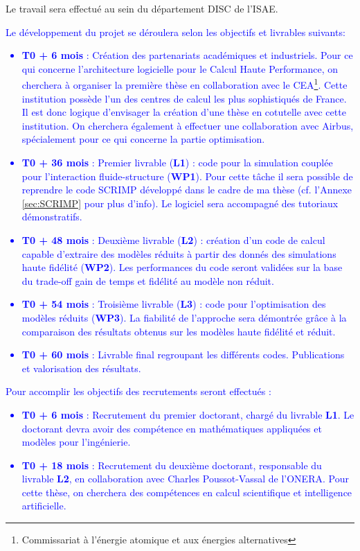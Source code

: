 \documentclass[12pt, french]{article}
\newcommand{\review}[1]{\textcolor{blue}{#1}}
\begin{document}
	Le travail sera effectué au sein du département DISC de l'ISAE. \review{Le développement du projet se déroulera selon les objectifs et livrables suivants:
	\begin{itemize}
		\item \textbf{T0 + 6 mois} : Création des partenariats académiques et industriels.
		Pour ce qui concerne l'architecture logicielle pour le Calcul Haute Performance, on cherchera à organiser la première thèse en collaboration avec le CEA\footnote{Commissariat à l'énergie atomique et aux énergies alternatives}. Cette institution possède l'un des centres de calcul les plus sophistiqués de France. Il est donc logique d'envisager la création d'une thèse en cotutelle avec cette institution. On cherchera également à effectuer une collaboration avec Airbus, spécialement pour ce qui concerne la partie optimisation.
		\item \textbf{T0 + 36 mois} : Premier livrable (\textbf{L1}) : code pour la simulation couplée pour l'interaction fluide-structure (\textbf{WP1}). Pour cette t\^ache il sera possible de reprendre le code SCRIMP développé dans le cadre de ma thèse (cf. l'Annexe \ref{sec:SCRIMP} pour plus d'info). Le logiciel sera accompagné des tutoriaux démonstratifs.
		\item \textbf{T0 + 48 mois} : Deuxième livrable (\textbf{L2}) : création d'un code de calcul capable d'extraire des modèles réduits à partir des donnés des simulations haute fidélité (\textbf{WP2}). Les performances du code seront validées sur la base du trade-off gain de temps et fidélité au modèle non réduit.
		\item \textbf{T0 + 54 mois} : Troisième livrable (\textbf{L3}) : code pour l'optimisation des modèles réduits (\textbf{WP3}). La fiabilité de l'approche sera démontrée grâce à la comparaison des résultats obtenus sur les modèles haute fidélité et réduit. 
		\item \textbf{T0 + 60 mois} : Livrable final regroupant les différents codes. 		Publications et valorisation des résultats. 
	\end{itemize} 
Pour accomplir les objectifs des recrutements seront effectués :
	\begin{itemize}
		\item \textbf{T0 + 6 mois} : Recrutement du premier doctorant, chargé du livrable \textbf{L1}. Le doctorant devra avoir des compétence en mathématiques appliquées et modèles pour l'ingénierie.
		\item \textbf{T0 + 18 mois} : Recrutement du deuxième doctorant, responsable du livrable \textbf{L2}, en collaboration avec Charles Poussot-Vassal de l'ONERA. Pour cette thèse, on cherchera des compétences en calcul scientifique et intelligence artificielle.

\end{itemize}}
\end{document}

